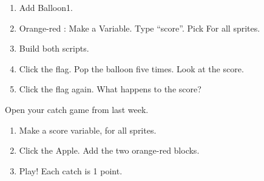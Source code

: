 \begin{exercise}
\begin{enumerate}[leftmargin=1.4em,itemsep=2pt]
  \item Add Balloon1.
  \item Orange-red : Make a Variable. Type \enquote{score}. Pick For all sprites.
  \item Build both scripts.
  \item Click the flag. Pop the balloon five times. Look at the score.
  \item Click the flag again. What happens to the score?
\end{enumerate}
\begin{center}
\begin{scratch}[scale=0.8]
\end{scratch}
\qquad
\begin{scratch}[scale=0.8]
\end{scratch}
\end{center}
\end{exercise}

\begin{exercise}
Open your catch game from last week.
\begin{enumerate}[leftmargin=1.4em,itemsep=2pt]
  \item Make a score variable, for all sprites.
  \item Click the Apple. Add the two orange-red blocks.
  \item Play! Each catch is 1 point.
\end{enumerate}
\begin{center}
\begin{scratch}[scale=0.7]
\end{scratch}
\end{center}
\end{exercise}

